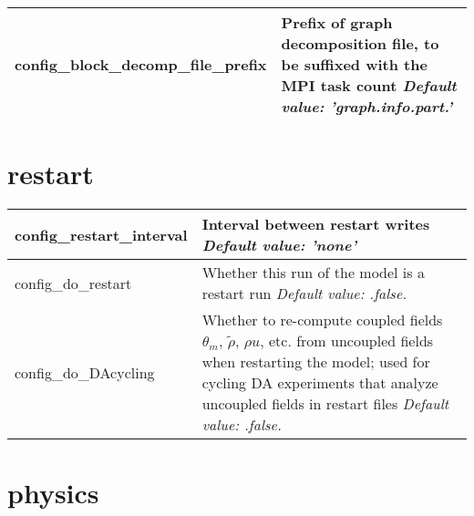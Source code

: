 {\small
\begin{longtable}{|p{2.0in} |p{4.25in}|}
 \hline
 
   config\_block\_decomp\_file\_prefix & Prefix of graph decomposition file, to be suffixed with the MPI task count \newline 
   {\em Default value: 'graph.info.part.'} \\ \hline

\end{longtable}
}

\section{restart}

{\small
\begin{longtable}{|p{2.0in} |p{4.25in}|}
 \hline
   config\_restart\_interval & Interval between restart writes \newline 
   {\em Default value: 'none'} \\ \hline
 
   config\_do\_restart & Whether this run of the model is a restart run \newline 
   {\em Default value: .false.} \\ \hline
 
   config\_do\_DAcycling & Whether to re-compute coupled fields $\theta_m$, $\tilde\rho$, $\rho u$,  etc. from uncoupled fields when restarting the model; used for cycling DA experiments that analyze uncoupled fields in restart files \newline 
   {\em Default value: .false.} \\ \hline   
\end{longtable}
}

\section{physics}

